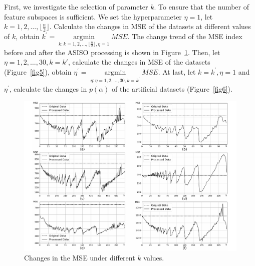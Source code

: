 \documentclass[sn-mathphys,Numbered]{sn-jnl}%
\theoremstyle{thmstyleone}%
\theoremstyle{thmstyletwo}%
\theoremstyle{thmstylethree}%
\begin{document}
First, we investigate the selection of parameter $k$. To ensure that the number of feature subspaces is sufficient. We set the hyperparameter $\eta=1$, let $k=1,2,\ldots,\lfloor{\frac{n}{2}}\rfloor$. Calculate the changes in MSE of the datasets at different values of $k$, obtain $k^\prime=\mathop{argmin}\limits_{k:k=1,2,\ldots,\lfloor\frac{n}{2}\rfloor,\eta=1}MSE$. The change trend of the MSE index before and after the ASISO processing is shown in Figure~\ref{fig4}. Then, let $\eta=1,2,\ldots,30,k=k'$, calculate the changes in MSE of the datasets (Figure~\ref{fig5}), obtain $\eta^\prime=\mathop{argmin}\limits_{\eta:\eta=1,2,\ldots,30,k=k^\prime}MSE$. At last, let $k=k^\prime,\eta=1$ and $\eta^\prime$, calculate the changes in $p(\alpha)$ of the artificial datasets (Figure~\ref{fig6}).



\begin{figure}[H]%
\centering
\vspace{-0.5cm}   %
\setlength{\abovecaptionskip}{0.cm} %
\setlength{\abovecaptionskip}{-0.2cm} %
\includegraphics[width=1\textwidth]{fig4.pdf}
\caption{Changes in the MSE under different $k$ values.}\label{fig4}
\end{figure}
\end{document}
